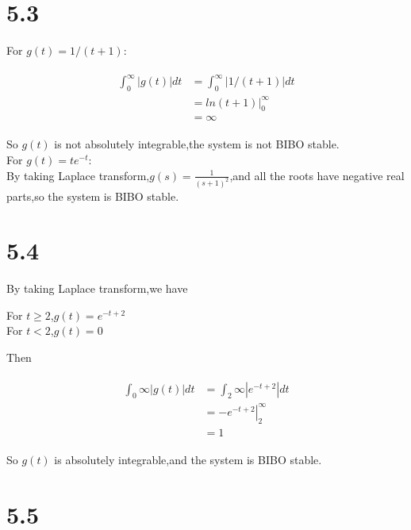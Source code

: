 \documentclass{article}
\begin{document}
\section*{5.3}
For $g(t)=1 /(t+1)$:\\
\begin{center}
\begin{eqnarray*}\begin{split}
\int_0^\infty \left|g(t)\right| dt &=\int_0^\infty\left|1 /(t+1)\right| dt\\
&=\left.ln(t+1)\right|^\infty_0\\
&=\infty
\end{split}\end{eqnarray*}
\end{center}

So $g(t)$ is not absolutely integrable,the system is not BIBO stable.\\

For $g(t)=t e^{-t}$:\\
By taking Laplace transform,$g(s)=\frac{1}{(s+1)^2}$,and all the roots have negative real parts,so the system is BIBO stable.\\

\section*{5.4}

By taking Laplace transform,we have\\
\begin{center}
    For $t\geq 2$,$g(t)=e^{-t+2}$\\
    For $t<2$,$g(t)=0$
\end{center}

Then\\
\begin{center}
    \begin{eqnarray*}\begin{split}
    \int_0\infty \left|g(t)\right| dt&=\int_2\infty \left|e^{-t+2}\right| dt\\
    &=\left.-e^{-t+2}\right|_2^\infty\\
    &=1
    \end{split}\end{eqnarray*}
\end{center}
So $g(t)$ is absolutely integrable,and the system is BIBO stable.\\

\section*{5.5}
\end{document}
